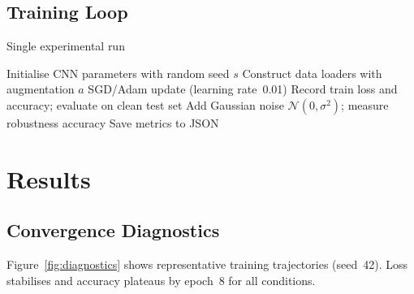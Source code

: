 \documentclass{article}
\begin{document}
\subsection{Training Loop}
\begin{algorithm}[H]
  \caption{Single experimental run}\label{alg:training}
  \begin{algorithmic}[1]
    \State Initialise CNN parameters with random seed $s$
    \State Construct data loaders with augmentation $a$
      \State SGD/Adam update (learning rate 0.01)
      \State Record train loss and accuracy; evaluate on clean test set
    \EndFor
      \State Add Gaussian noise $\mathcal N(0,\sigma^2)$; measure robustness accuracy
    \EndFor
    \State Save metrics to JSON
  \end{algorithmic}
\end{algorithm}

\section{Results}

\subsection{Convergence Diagnostics}
Figure~\ref{fig:diagnostics} shows representative training trajectories (seed 42). Loss stabilises and accuracy plateaus by epoch 8 for all conditions.
\end{document}
